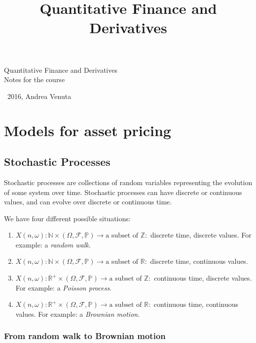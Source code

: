 \documentclass[oneside,titlepage,headinclude,12pt,a4paper,BCOR5mm,footinclude]{book}
\title{Quantitative Finance and Derivatives}
\theoremstyle{defn}
\begin{document}
\begin{titlepage}

  \centering
  \vspace*{6cm}

  {\LARGE Quantitative Finance and Derivatives}
  \\
  \vspace{.5cm}
  {\large Notes for the course}

  \vspace{11cm}

  {\small \textcopyright\  2016, Andrea Venuta}

\end{titlepage}

\tableofcontents

\chapter{Models for asset pricing}

\section{Stochastic Processes}

Stochastic  processes are  collections  of random  variables representing  the
evolution of some system over time.  Stochastic processes can have discrete or
continuous values, and can evolve over discrete or continuous time.

We have four different possible situations:
\begin{enumerate}
  \item \(X(n,\omega) : \mathbb{N} \times (\Omega,\mathcal{F},\mathbb{P}) \to \text{a subset of } \mathbb{Z}:\) discrete time, discrete values. For example: a \textit{random walk}.
  \item \(X(n,\omega) : \mathbb{N} \times (\Omega,\mathcal{F},\mathbb{P}) \to \text{a subset of } \mathbb{R}:\) discrete time, continuous values.
  \item \(X(n,\omega) : \mathbb{R}^+ \times (\Omega,\mathcal{F},\mathbb{P}) \to \text{a subset of } \mathbb{Z}:\) continuous time, discrete values. For example: a \textit{Poisson process}.
  \item \(X(n,\omega) : \mathbb{R}^+ \times (\Omega,\mathcal{F},\mathbb{P}) \to \text{a subset of } \mathbb{R}:\) continuous time, continuous values. For example: a \textit{Brownian motion}.
\end{enumerate}

\subsection{From random walk to Brownian motion}
\end{document}
